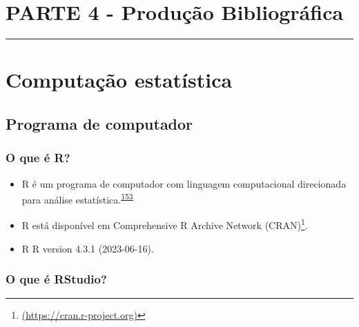 \documentclass[
]{book}
\renewcommand{\href}[2]{#2\footnote{\url{#1}}}
\begin{document}

\hypertarget{parte-4---produuxe7uxe3o-bibliogruxe1fica}{%
\chapter*{\texorpdfstring{\textbf{PARTE 4 - Produção Bibliográfica}}{PARTE 4 - Produção Bibliográfica}}\label{parte-4---produuxe7uxe3o-bibliogruxe1fica}}

\markboth{}{}
\par\noindent\rule{\textwidth}{0.05in}

\hypertarget{computacao-estatistica}{%
\chapter{\texorpdfstring{\textbf{Computação estatística}}{Computação estatística}}\label{computacao-estatistica}}

\hypertarget{inicio}{%
\section{Programa de computador}\label{inicio}}

\hypertarget{o-que-uxe9-r}{%
\subsection{O que é R?}\label{o-que-uxe9-r}}

\begin{itemize}
\item
  R é um programa de computador com linguagem computacional direcionada para análise estatística.\textsuperscript{\protect\hyperlink{ref-ihaka1996}{153}}
\item
  R está disponível em \href{(https://cran.r-project.org)}{Comprehensive R Archive Network (CRAN)}.
\item
  R R version 4.3.1 (2023-06-16).
\end{itemize}

\hypertarget{o-que-uxe9-rstudio}{%
\subsection{O que é RStudio?}\label{o-que-uxe9-rstudio}}
\end{document}
